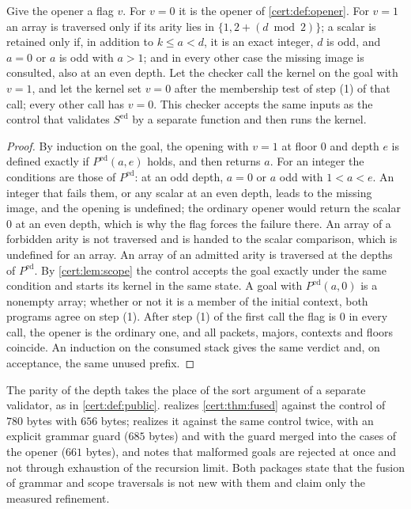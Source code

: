 \begin{theorem}\label{cert:thm:fused}
Give the opener a flag $v$. For $v=0$ it is the opener of
\cref{cert:def:opener}. For $v=1$ an array is traversed only if its arity lies
in $\{1,2+(d\bmod 2)\}$; a scalar is retained only if, in addition to
$k\le a<d$, it is an exact integer, $d$ is odd, and $a=0$ or $a$ is odd with
$a>1$; and in every other case the missing image is consulted, also at an
even depth. Let the checker call the kernel on the goal with $v=1$, and let
the kernel set $v=0$ after the membership test of step (1) of that call;
every other call has $v=0$. This checker accepts the same inputs as the
control that validates $S^{\mathrm{ed}}$ by a separate function and then runs
the kernel.
\end{theorem}
\begin{proof}
By induction on the goal, the opening with $v=1$ at floor $0$ and depth $e$ is
defined exactly if $P^{\mathrm{ed}}(a,e)$ holds, and then returns $a$. For an
integer the conditions are those of $P^{\mathrm{ed}}$: at an odd depth, $a=0$
or $a$ odd with $1<a<e$. An integer that fails them, or any scalar at an even
depth, leads to the missing image, and the opening is undefined; the ordinary
opener would return the scalar $0$ at an even depth, which is why the flag
forces the failure there. An array of a forbidden arity is not traversed and
is handed to the scalar comparison, which is undefined for an array. An
array of an admitted arity is traversed at the depths of $P^{\mathrm{ed}}$.
By \cref{cert:lem:scope} the control accepts the goal exactly under the same
condition and starts its kernel in the same state. A goal with
$P^{\mathrm{ed}}(a,0)$ is a nonempty array; whether or not it is a member of
the initial context, both programs agree on step (1). After step (1) of the
first call the flag is $0$ in every call, the opener is the ordinary one, and
all packets, majors, contexts and floors coincide. An induction on the
consumed stack gives the same verdict and, on acceptance, the same unused
prefix.
\end{proof}

The parity of the depth takes the place of the sort argument of a separate
validator, as in \cref{cert:def:public}. 
realizes \cref{cert:thm:fused} against the control of $780$ bytes with $656$
bytes;  realizes it against the same control twice,
with an explicit grammar guard ($685$ bytes) and with the guard merged into
the cases of the opener ($661$ bytes), and notes that malformed goals are
rejected at once and not through exhaustion of the recursion limit. Both
packages state that the fusion of grammar and scope traversals is not new
with them and claim only the measured refinement.

